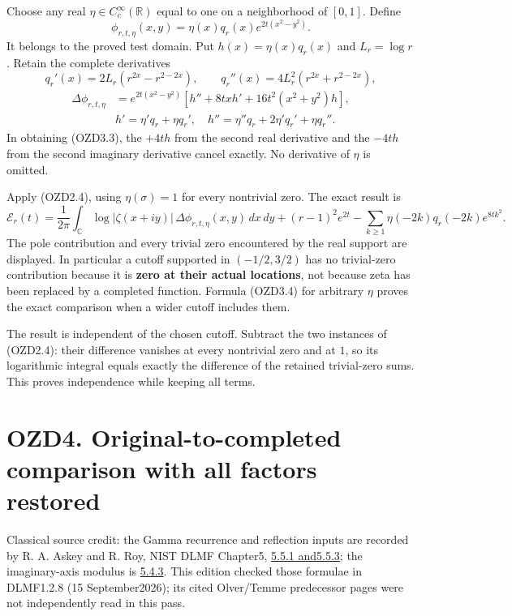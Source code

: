Choose any real \(\eta\in C_c^\infty(\mathbb R)\) equal to one on a
neighborhood of \([0,1]\). Define \[
\phi_{r,t,\eta}(x,y)=\eta(x)q_r(x)e^{2t(x^2-y^2)}.
\tag{OZD3.1}
\] It belongs to the proved test domain. Put \(h(x)=\eta(x)q_r(x)\) and
\(L_r=\log r\). Retain the complete derivatives \[
q_r'(x)=2L_r(r^{2x}-r^{2-2x}),\qquad
q_r''(x)=4L_r^2(r^{2x}+r^{2-2x}),
\tag{OZD3.2}
\] \[
\begin{aligned}
\Delta\phi_{r,t,\eta}
&=e^{2t(x^2-y^2)}\left[h''+8txh'+16t^2(x^2+y^2)h\right],
\\& h'=\eta'q_r+\eta q_r',\quad
h''=\eta''q_r+2\eta'q_r'+\eta q_r''.
\end{aligned}
\tag{OZD3.3}
\] In obtaining (OZD3.3), the \(+4th\) from the second real derivative
and the \(-4th\) from the second imaginary derivative cancel exactly. No
derivative of \(\eta\) is omitted.

Apply (OZD2.4), using \(\eta(\sigma)=1\) for every nontrivial zero. The
exact result is \[
\boxed{\mathcal E_r(t)=\frac1{2\pi}\int_{\mathbb C}
\log|\zeta(x+iy)|\,\Delta\phi_{r,t,\eta}(x,y)\,dx\,dy
+(r-1)^2e^{2t}
-\sum_{k\ge1}\eta(-2k)q_r(-2k)e^{8tk^2}.}
\tag{OZD3.4}
\] The pole contribution and every trivial zero encountered by the real
support are displayed. In particular a cutoff supported in
\((-1/2,3/2)\) has no trivial-zero contribution because it is
\textbf{zero at their actual locations}, not because zeta has been
replaced by a completed function. Formula (OZD3.4) for arbitrary
\(\eta\) proves the exact comparison when a wider cutoff includes them.

The result is independent of the chosen cutoff. Subtract the two
instances of (OZD2.4): their difference vanishes at every nontrivial
zero and at \(1\), so its logarithmic integral equals exactly the
difference of the retained trivial-zero sums. This proves independence
while keeping all terms.

\section{OZD4. Original-to-completed comparison with all factors
restored}\label{ozd4.-original-to-completed-comparison-with-all-factors-restored}

Classical source credit: the Gamma recurrence and reflection inputs are
recorded by R. A. Askey and R. Roy, NIST DLMF Chapter5,
\href{https://dlmf.nist.gov/5.5}{5.5.1 and5.5.3}; the imaginary-axis
modulus is \href{https://dlmf.nist.gov/5.4\#E3}{5.4.3}. This edition
checked those formulae in DLMF1.2.8 (15 September2026); its cited
Olver/Temme predecessor pages were not independently read in this pass.

